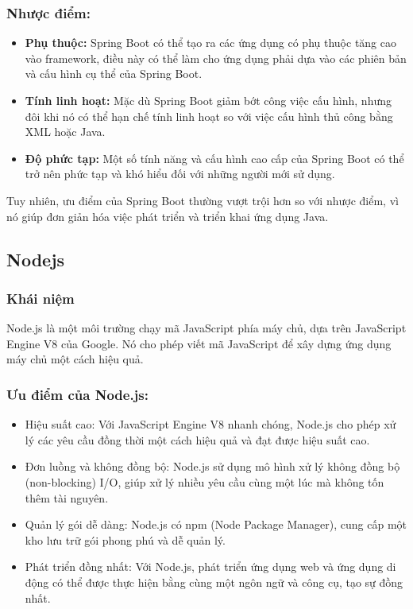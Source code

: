 \subsubsection{Nhược điểm:}
\begin{itemize}
    \item \textbf{Phụ thuộc:} Spring Boot có thể tạo ra các ứng dụng có phụ thuộc tăng cao vào framework, điều này có thể làm cho ứng dụng phải dựa vào các phiên bản và cấu hình cụ thể của Spring Boot.
    \item \textbf{Tính linh hoạt:} Mặc dù Spring Boot giảm bớt công việc cấu hình, nhưng đôi khi nó có thể hạn chế tính linh hoạt so với việc cấu hình thủ công bằng XML hoặc Java.
    \item \textbf{Độ phức tạp:} Một số tính năng và cấu hình cao cấp của Spring Boot có thể trở nên phức tạp và khó hiểu đối với những người mới sử dụng.
\end{itemize}
\indent Tuy nhiên, ưu điểm của Spring Boot thường vượt trội hơn so với nhược điểm, vì nó giúp đơn giản hóa việc phát triển và triển khai ứng dụng Java.

\subsection{Nodejs}
\subsubsection{Khái niệm}
\indent Node.js là một môi trường chạy mã JavaScript phía máy chủ, dựa trên JavaScript Engine V8 của Google. Nó cho phép viết mã JavaScript để xây dựng ứng dụng máy chủ một cách hiệu quả.
\subsubsection{Ưu điểm của Node.js:}
\begin{itemize}
    \item Hiệu suất cao: Với JavaScript Engine V8 nhanh chóng, Node.js cho phép xử lý các yêu cầu đồng thời một cách hiệu quả và đạt được hiệu suất cao.
    \item Đơn luồng và không đồng bộ: Node.js sử dụng mô hình xử lý không đồng bộ (non-blocking) I/O, giúp xử lý nhiều yêu cầu cùng một lúc mà không tốn thêm tài nguyên.
    \item Quản lý gói dễ dàng: Node.js có npm (Node Package Manager), cung cấp một kho lưu trữ gói phong phú và dễ quản lý.
    \item Phát triển đồng nhất: Với Node.js, phát triển ứng dụng web và ứng dụng di động có thể được thực hiện bằng cùng một ngôn ngữ và công cụ, tạo sự đồng nhất.
\end{itemize}
